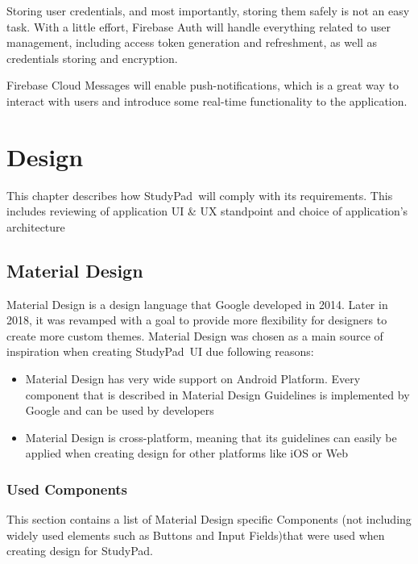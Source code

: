 \documentclass[thesis=B,english]{FITthesis}[2012/10/20]
\newcommand{\appname}{StudyPad}
\begin{document}
Storing user credentials, and most importantly, storing them safely is not an easy task. With a little effort, Firebase Auth will handle everything related to user management, including access token generation and refreshment, as well as credentials storing and encryption.

Firebase Cloud Messages will enable push-notifications, which is a great way to interact with users and introduce some real-time functionality to the application. 

	
\chapter{Design}

This chapter describes how \appname\ will comply with its requirements. This includes reviewing of application UI \& UX standpoint and choice of application's architecture

\section{Material Design}
Material Design is a design language that Google developed in 2014. Later in 2018, it was revamped with a goal to provide more flexibility for designers to create more custom themes. Material Design was chosen as a main source of inspiration when creating \appname\ UI due following  reasons:
\begin{itemize}
	\item Material Design has very wide support on Android Platform. Every component that is described in Material Design Guidelines is implemented by Google and can be used by developers
	\item Material Design is cross-platform, meaning that its guidelines can easily be applied when creating design for other platforms like iOS or Web
\end{itemize}



\subsection{Used Components}
This section contains a list of Material Design specific Components (not including widely used elements such as Buttons and Input Fields)that were used when creating design for \appname.
\end{document}
